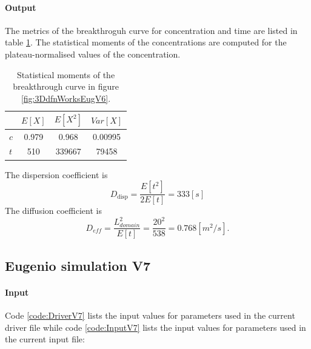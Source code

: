 \documentclass{article}
\begin{document}
\FloatBarrier  %
\paragraph{Output} The metrics of the breakthroguh curve for concentration and time are listed in table \ref{tab:StatMomV6}. The statistical moments of the concentrations are computed for the plateau-normalised values of the concentration.
\begin{table}[h!]
\centering
\begin{tabular}{lccc}
\toprule
        & $ E[X]$ & $E[X^2]$ & $Var[X]$ \\
\midrule
$c$     & 0.979        & 0.968           & 0.00995           \\
$t$     & 510          & 339667          & 79458             \\
\bottomrule
\end{tabular}
\caption{Statistical moments of the breakthrough curve in figure \ref{fig:3DdfnWorksEugV6}.}
\label{tab:StatMomV6}
\end{table}

The dispersion coefficient is
\[ D_{\text{disp}} = \frac{E[t^2]}{2 E[t]} = 333 [s] \]
The diffusion coefficient is
\[ D_{eff} = \frac{L_{domain}^2}{E[t]} = \frac{20^2}{538} = 0.768 [m^2/s]. \]

\FloatBarrier  %
\subsection{Eugenio simulation V7}
\paragraph{Input} Code \ref{code:DriverV7} lists the input values for parameters used in the current driver file while code \ref{code:InputV7} lists the input values for parameters used in the current input file:




\end{document}
